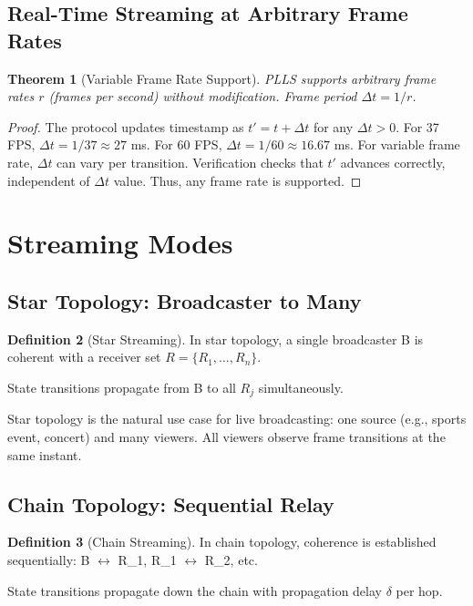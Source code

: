 \documentclass[twocolumn,10pt,a4paper]{article}
\theoremstyle{plain}
\newtheorem{theorem}{Theorem}[section]
\theoremstyle{definition}
\newtheorem{definition}[theorem]{Definition}
\begin{document}
\subsection{Real-Time Streaming at Arbitrary Frame Rates}

\begin{theorem}[Variable Frame Rate Support]
PLLS supports arbitrary frame rates $r$ (frames per second) without modification. Frame period $\Delta t = 1/r$.
\end{theorem}

\begin{proof}
The protocol updates timestamp as $t' = t + \Delta t$ for any $\Delta t > 0$. For 37 FPS, $\Delta t = 1/37 \approx 27$ ms. For 60 FPS, $\Delta t = 1/60 \approx 16.67$ ms. For variable frame rate, $\Delta t$ can vary per transition. Verification checks that $t'$ advances correctly, independent of $\Delta t$ value. Thus, any frame rate is supported.
\end{proof}

\section{Streaming Modes}
\label{sec:modes}

\subsection{Star Topology: Broadcaster to Many}

\begin{definition}[Star Streaming]
In star topology, a single broadcaster B is coherent with a receiver set $R = \{R_1, \ldots, R_n\}$.

State transitions propagate from B to all $R_j$ simultaneously.
\end{definition}

Star topology is the natural use case for live broadcasting: one source (e.g., sports event, concert) and many viewers. All viewers observe frame transitions at the same instant.

\subsection{Chain Topology: Sequential Relay}

\begin{definition}[Chain Streaming]
In chain topology, coherence is established sequentially: B $\leftrightarrow$ R_1, R_1 $\leftrightarrow$ R_2, etc.

State transitions propagate down the chain with propagation delay $\delta$ per hop.
\end{definition}
\end{document}
